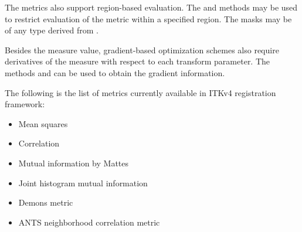 The metrics also support region-based evaluation. The  and
 methods may be used to restrict evaluation of the metric
within a specified region. The masks may be of any type derived from .

Besides the measure value, gradient-based optimization schemes also require
derivatives of the measure with respect to each transform parameter. The
methods  and  can be
used to obtain the gradient information.


The following is the list of metrics currently available in ITKv4 registration framework:
\begin{itemize}
\item Mean squares\\ 
\item Correlation \\ 
\item Mutual information by Mattes \\ 
\item Joint histogram mutual information \\ 
\item Demons metric \\ 
\item ANTS neighborhood correlation metric \\ 
\end{itemize}


